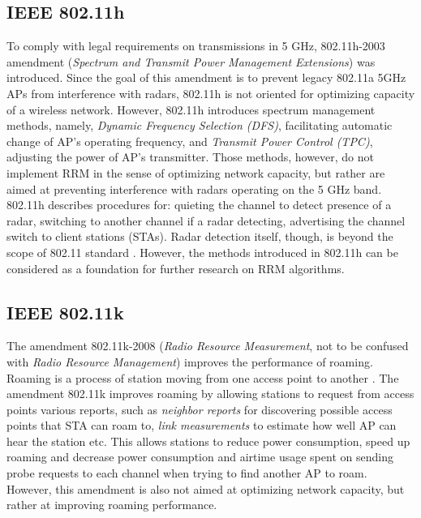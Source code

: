 \subsection {IEEE 802.11h}
\label{chap:lr:sec:80211h}
To comply with legal requirements on transmissions in 5 GHz, 802.11h-2003 \cite{80211h} amendment (\textit{Spectrum and Transmit Power Management Extensions}) was introduced. Since the goal of this amendment is to prevent legacy 802.11a 5GHz APs from interference with radars, 802.11h is not oriented for optimizing capacity of a wireless network. However, 802.11h introduces \cite{konsgenSpectrumManagementAlgorithms2010} spectrum management methods, namely, \textit{Dynamic Frequency Selection (DFS)}, facilitating automatic change of AP's operating frequency, and \textit{Transmit Power Control (TPC)}, adjusting the power of AP's transmitter.
Those methods, however, do not implement RRM in the sense of optimizing network capacity, but rather are aimed at preventing interference with radars operating on the 5 GHz band. 802.11h describes procedures for: quieting the channel to detect presence of a radar, switching to another channel if a radar detecting, advertising the channel switch to client stations (STAs). Radar detection itself, though, is beyond the scope of 802.11 standard \cite{80211h}.
However, the methods introduced in 802.11h can be considered as a foundation for further research on RRM algorithms.



\subsection {IEEE 802.11k}
\label{chap:lr:sec:80211k}
The amendment 802.11k-2008 \cite{80211k} (\textit{Radio Resource Measurement}, not to be confused with \textit{Radio Resource Management}) improves the performance of roaming. Roaming is a process of station moving from one access point to another \cite{colemanCWNACertifiedWireless2021}. The amendment 802.11k improves roaming by allowing stations to request from access points various reports, such as \textit{neighbor reports} for discovering possible access points that STA can roam to, \textit{link measurements} to estimate how well AP can hear the station etc. This allows stations to reduce power consumption, speed up roaming and decrease power consumption and airtime usage spent on sending probe requests to each channel when trying to find another AP to roam.
However, this amendment is also not aimed at optimizing network capacity, but rather at improving roaming performance.


